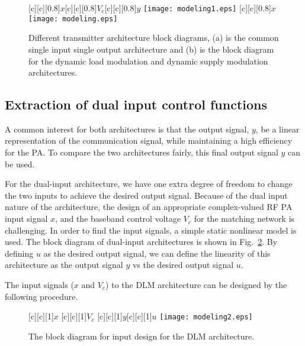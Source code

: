 \documentclass[10pt,journal]{IEEEtran}
\begin{document}
\begin{figure}
\centering
{}[c][c][0.8]{$x$}[c][c][0.8]{$V_\text{c}$}[c][c][0.8]{$y$}
\subfigure[]{\label{fig:SISO}}\texttt{[image: modeling1.eps]}
[c][c][0.8]{$x$}
\subfigure[]{\label{fig:MISO}}\texttt{[image: modeling.eps]}
\caption{Different transmitter architecture block diagrams, (a) is the common single input single output architecture and (b) is the block diagram for the dynamic load modulation and dynamic supply modulation architectures.}
\label{tranblock}
\end{figure}

\subsection{Extraction of dual input control functions}

A common interest for both architectures is that the output signal, $y$, be a linear representation of the communication signal, while maintaining a high efficiency for the PA. To compare the two architectures fairly, this final output signal $y$ can be used.

For the dual-input architecture, we have one extra degree of freedom to change the two inputs to achieve the desired output signal. Because of the dual input nature of the architecture, the design of an appropriate complex-valued RF PA input signal $x$, and the baseband control voltage $V_c$ for the matching network is challenging. In order to find the input signals, a simple static nonlinear model is used. The block diagram of dual-input architectures is shown in Fig.~\ref{modeling2}. By defining $u$ as the desired output signal, we can define the linearity of this architecture as the output signal $y$ vs the desired output signal $u$.

The input signals ($x$ and $V_\text{c}$) to the DLM architecture can be designed by the following procedure.

\begin{figure}
\centering {}[c][c][1]{$x$} [c][c][1]{$V_c$}
[c][c][1]{$y$}[c][c][1]{$u$}
\texttt{[image: modeling2.eps]}
\caption{The block diagram for input design for the DLM architecture.}
\label{modeling2}
\end{figure}
\end{document}
